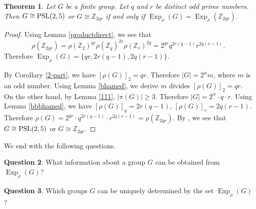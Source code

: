 \documentclass[12pt]{amsart}
\newtheorem{theorem}{Theorem}[section]
\theoremstyle{definition}
\newtheorem{question}[theorem]{Question}
\begin{document}
\begin{theorem}
	Let $G$ be a finite group. Let  $q$ and $r$ be distinct  odd prime numbers. Then
		$G \cong {\rm PSL}(2, 5)$  or $G \cong \mathbb{Z}_{2qr}$  if and only if  ${\operatorname{Exp}}_{\rho}(G) =  {\operatorname{Exp}}_{\rho}(\mathbb{Z}_{2qr})$.
\end{theorem}
\begin{proof}
	Using Lemma \ref{productdirect}, we see that
	$$\rho(\mathbb{Z}_{2qr})=\rho(\mathbb{Z}_2)^{qr}\rho(\mathbb{Z}_q)^{2r}\rho(\mathbb{Z}_r)^{2q}=2^{qr}q^{2r(q-1)}r^{2q(r-1)}.$$
	Therefore ${\operatorname{Exp}}_{\rho}(G) = \{{qr}, {2r(q-1)}, {2q(r-1)}\}$.
	
	By Corollary \ref{2-part}, we have $[\rho(G)]_2=qr$. Therefore $|G|=2^{\alpha } m$, where $m$ is an odd number.
	Using Lemma \ref{bhamed}, we derive $m$	divides  $[\rho(G)]_2=qr$.
	On the other hand,
	by Lemma  \ref{111}, $|\pi(G)|\geqslant 3$.
	Therefore $|G|=2^\alpha\cdot q  \cdot r$.   
	Using Lemma \ref{bbbhamed},
	we have $[\rho(G)]_q=2r(q-1)$, $[\rho(G)]_r=2q(r-1)$. Therefore  
	$\rho(G) = 2^{qr}\cdot q^{2r(q-1)}\cdot r^{2q(r-1)}=\rho(\mathbb{Z}_{2qr})$.
	By \cite[Theorem 2.5]{banihamedapplication}, we see that $G \cong {\rm PSL}(2,5)$ or $G \cong \mathbb{Z}_{2qr}$.
\end{proof}	


We end with the following questions.
\begin{question}
	What information about a group $G$ can be obtained from ${\operatorname{Exp}}_{\rho}(G)$?
\end{question}
\begin{question}
	Which groups $G$ can be uniquely determined by the set ${\operatorname{Exp}}_{\rho}(G)$?
\end{question}
\end{document}
